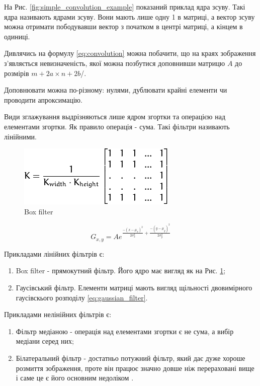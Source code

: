 На Рис. \ref{fig:simple_convolution_example} показаний приклад ядра зсуву. Такі ядра називають ядрами зсуву. Вони мають лише одну 1 в матриці, а вектор зсуву можна отримати пободувавши вектор з початком в центрі матриці, а кінцем в одиниці.

Дивлячись на формулу \ref{eq:convolution} можна побачити, що на краях зображення з'являється невизначеність, якої можна позбутися доповнивши матрицю $A$ до розмірів $m+2a \times n + 2b$/.

Доповнювати можна по-різному: нулями, дублювати крайні елементи чи проводити апроксимацію.

Види зглажування выдрізняються лише ядром згортки та операцією над елементами згортки. Як правило операція - сума. Такі фільтри називають лінійними.

\begin{figure}[H]
	\centering
	\includegraphics[width=0.7\linewidth]{theory/img/box_filter_representation}
	\caption{Box filter}
	\label{fig:box_filter_representation}
\end{figure}

\begin{equation}
G_{x,y} = Ae^{\frac{-(x-\mu_{x})^{2}}{2\sigma^{2}_{x}} + \frac{-(y-\mu_{y})^{2}}{2\sigma^{2}_{y}}}
\label{eq:gaussian_filter}
\end{equation}

Прикладами лінійних фільтрів є:
\begin{enumerate}
	\item Box filter - прямокутний фільтр. Його ядро має вигляд як на Рис. \ref{fig:box_filter_representation};
	\item Гаусівський фільтр. Елементи матриці мають вигляд щільності двовимірного гаусівскього розподілу \ref{eq:gaussian_filter}.
\end{enumerate}

Прикладами нелінійних фільтрів є:
\begin{enumerate}
	\item Фільтр медіаною - операція над елементами згортки є не сума, а вибір медіани серед них;
	\item Білатеральний фільтр - достатньо потужний фільтр, який дає дуже хороше розмиття зображення, проте він працює значно довше ніж перераховані вище і саме це є його основним недоліком \cite{BilateralFilter}.
\end{enumerate}